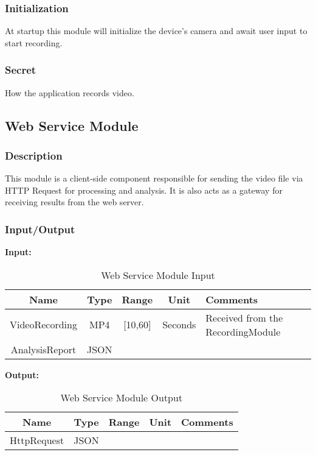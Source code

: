 \documentclass{article}
\begin{document}
\subsubsection{Initialization}
At startup this module will initialize the device’s camera and await user input to start recording.

\subsubsection{Secret}
How the application records video.

\subsection{Web Service Module}

\subsubsection{Description}
This module is a client-side component responsible for sending the video file via HTTP Request for processing and analysis. It is also acts as a gateway for receiving results from the web server.

\subsubsection{Input/Output}
\textbf{Input:}
\begin{table}[H]
    \caption{Web Service Module Input}
    \centering
    \begin{tabularx}{0.7\textwidth}{|c|c|c|c|X|} \hline
        \textbf{Name} & \textbf{Type} & \textbf{Range} & \textbf{Unit} & \textbf{Comments} \\ \hline
        VideoRecording & MP4 & [10,60] & Seconds & Received from the RecordingModule\\ \hline
        AnalysisReport & JSON & & & \\ \hline
    \end{tabularx}
    \label{tab:Web_Service_Input}
\end{table}

\textbf{Output:}
\begin{table}[H]
    \centering
    \begin{tabularx}{0.7\textwidth}{|c|c|c|c|X|} \hline
        \textbf{Name} & \textbf{Type} & \textbf{Range} & \textbf{Unit} & \textbf{Comments} \\ \hline
        HttpRequest & JSON & & &\\ \hline
    \end{tabularx}
    \caption{Web Service Module Output}
    \label{tab:Web_Service_Output}
\end{table}
\end{document}
